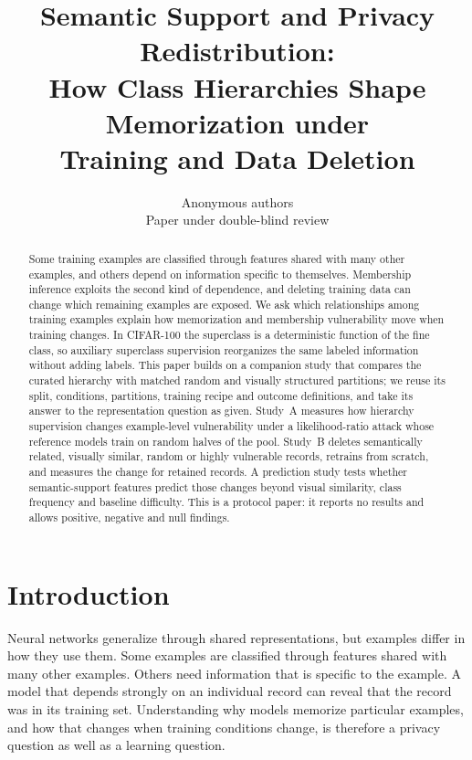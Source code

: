 \documentclass{article} %
\title{Semantic Support and Privacy Redistribution: \\
How Class Hierarchies Shape Memorization under \\
Training and Data Deletion}
\author{Anonymous authors\\
Paper under double-blind review}
\begin{document}
\maketitle

\begin{abstract}
Some training examples are classified through features shared with many other examples, and others depend on information specific to themselves. Membership inference exploits the second kind of dependence, and deleting training data can change which remaining examples are exposed. We ask which relationships among training examples explain how memorization and membership vulnerability move when training changes. In CIFAR-100 the superclass is a deterministic function of the fine class, so auxiliary superclass supervision reorganizes the same labeled information without adding labels. This paper builds on a companion study that compares the curated hierarchy with matched random and visually structured partitions; we reuse its split, conditions, partitions, training recipe and outcome definitions, and take its answer to the representation question as given. Study~A measures how hierarchy supervision changes example-level vulnerability under a likelihood-ratio attack whose reference models train on random halves of the pool. Study~B deletes semantically related, visually similar, random or highly vulnerable records, retrains from scratch, and measures the change for retained records. A prediction study tests whether semantic-support features predict those changes beyond visual similarity, class frequency and baseline difficulty. This is a protocol paper: it reports no results and allows positive, negative and null findings.
\end{abstract}

\section{Introduction}
\label{sec:intro}

Neural networks generalize through shared representations, but examples differ in how they use them. Some examples are classified through features shared with many other examples. Others need information that is specific to the example. A model that depends strongly on an individual record can reveal that the record was in its training set. Understanding why models memorize particular examples, and how that changes when training conditions change, is therefore a privacy question as well as a learning question.
\end{document}
